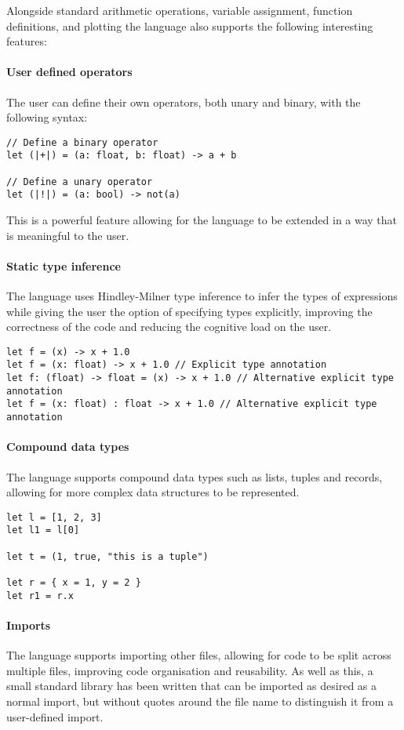 Alongside standard arithmetic operations, variable assignment, function definitions, and plotting the language also 
supports the following interesting features:

\paragraph{User defined operators} The user can define their own operators, both unary and binary, with the 
following syntax:

\begin{verbatim}
// Define a binary operator
let (|+|) = (a: float, b: float) -> a + b

// Define a unary operator
let (|!|) = (a: bool) -> not(a)
\end{verbatim}

This is a powerful feature allowing for the language to be extended in a way that is meaningful to the user.

\paragraph{Static type inference} The language uses Hindley-Milner type inference to infer the types of
expressions while giving the user the option of specifying types explicitly, improving the correctness of the
code and reducing the cognitive load on the user.

\begin{verbatim}
let f = (x) -> x + 1.0
let f = (x: float) -> x + 1.0 // Explicit type annotation
let f: (float) -> float = (x) -> x + 1.0 // Alternative explicit type annotation
let f = (x: float) : float -> x + 1.0 // Alternative explicit type annotation
\end{verbatim}

\paragraph{Compound data types} The language supports compound data types such as lists, tuples and records,
allowing for more complex data structures to be represented.

\begin{verbatim}
let l = [1, 2, 3]
let l1 = l[0]

let t = (1, true, "this is a tuple")

let r = { x = 1, y = 2 }
let r1 = r.x
\end{verbatim}

\paragraph{Imports} The language supports importing other files, allowing for code to be split across multiple
files, improving code organisation and reusability.
As well as this, a small standard library has been written that can be imported as desired as a normal import, but 
without quotes around the file name to distinguish it from a user-defined import.

